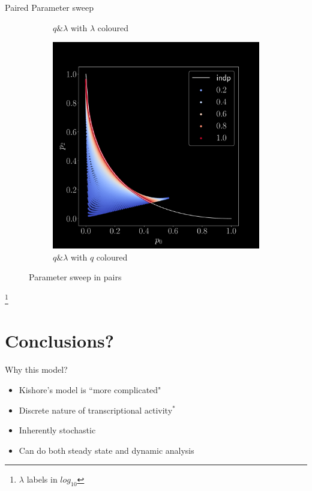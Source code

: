 \documentclass[aspectratio=169,9pt]{beamer}
\begin{document}
\begin{frame}{Paired Parameter sweep}
\begin{figure}[h]
\begin{adjustwidth}{-7cm}{-7cm}
\begin{subfigure}[b]{0.25\textwidth}
        \caption{$q \& \lambda$ with $\lambda$ coloured}
      \end{subfigure}
      \begin{subfigure}[b]{0.25\textwidth}
        \centering
        \includegraphics[width=\textwidth]{sweep-ql-q}
        \caption{$q \& \lambda$ with $q$ coloured}
      \end{subfigure}
    \end{adjustwidth}
    \pause[-1]\caption{Parameter sweep in pairs}
  \end{figure}
  \footnote{$\lambda$ labels in $log_{10}$}
\end{frame}

\section{Conclusions?}
\begin{frame}{Why this model?}
  \begin{itemize}
    \item \pause Kishore's model is ``more complicated"
    \item \pause Discrete nature of transcriptional activity$^*$
    \item \pause Inherently stochastic
    \item \pause Can do both steady state and dynamic analysis
  \end{itemize}
\end{frame}
\end{document}
